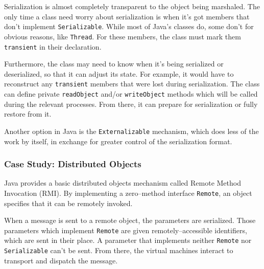 Serialization is almost completely transparent to the object being marshaled.
The only time a class need worry about serialization is when it's got members
that don't implement \texttt{Serializable}. While most of Java's classes do,
some don't for obvious reasons, like \texttt{Thread}. For these members, the
class must mark them \texttt{transient} in their declaration.

Furthermore, the class may need to know when it's being serialized or
deserialized, so that it can adjust its state. For example, it would have to
reconstruct any \texttt{transient} members that were lost during
serialization. The class can define private \texttt{readObject} and/or
\texttt{writeObject} methods which will be called during the relevant
processes. From there, it can prepare for serialization or fully restore from
it.

Another option in Java is the \texttt{Externalizable} mechanism, which does
less of the work by itself, in exchange for greater control of the
serialization format.


\subsubsection{Case Study: Distributed Objects}

Java provides a basic distributed objects mechanism called Remote Method
Invocation (RMI)\cite{java-rmi}. By implementing a zero--method interface
\texttt{Remote}, an object specifies that it can be remotely invoked.

When a message is sent to a remote object, the parameters are serialized.
Those parameters which implement \texttt{Remote} are given
remotely--accessible identifiers, which are sent in their place. A parameter
that implements neither \texttt{Remote} nor \texttt{Serializable} can't be
sent. From there, the virtual machines interact to transport and dispatch the
message.
